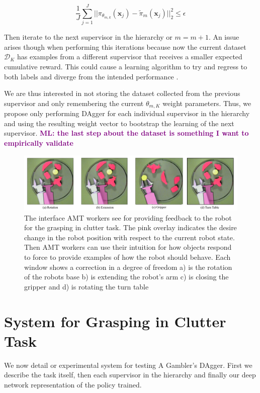 \documentclass[10pt, conference]{ieeeconf}      %
\newcommand{\mlnote}[1]{\ifthenelse{ \boolean{include-notes}}%
 {\textcolor{purple}{\textbf{ML: #1}}}{}}
\begin{document}
$$\frac{1}{J} \sum^J_{j=1} ||\pi_{\theta_{m,k}}(\mathbf{x}_j) - \tilde{\pi}_m(\mathbf{x}_j) ||^2_2 \leq \epsilon$$

Then iterate to the next supervisor in the hierarchy or $m = m+1$. An issue arises though when performing this iterations because now the current dataset $\mathcal{D}_K$ has examples from a different supervisor that receives a smaller expected cumulative reward. This could cause a learning algorithm to try and regress to both labels and diverge from the intended performance \cite{scholkopf2002learning}.

We are thus interested in not storing the dataset collected from the previous supervisor and only remembering the current $\theta_{m,K}$ weight parameters. Thus, we propose only performing DAgger for each individual supervisor in the hierarchy and using the resulting weight vector to bootstrap the learning of the next supervisor. \mlnote{the last step about the dataset is something I want to empirically validate}
 
\begin{figure}[t]
\centering

\includegraphics[width=\textwidth]{f_figs/Labeling_GUI.pdf}

\caption{\footnotesize  The interface AMT workers see for providing feedback to the robot for the grasping in clutter task. The pink overlay indicates the desire change in the robot position with respect to the current robot state. Then AMT workers can use their intuition for how objects respond to force to provide examples of how the robot should behave. Each window shows a correction in a degree of freedom a) is the rotation of the robots base b) is extending the robot's arm c) is closing the gripper and d) is rotating the turn table}
\vspace*{-20pt}
\label{fig:overlays}
\end{figure}


\section{System for Grasping in Clutter Task}
We now detail or experimental system for testing A Gambler's DAgger. First we describe the task itself, then each supervisor in the hierarchy and finally our deep network representation of the policy trained. 
\end{document}
